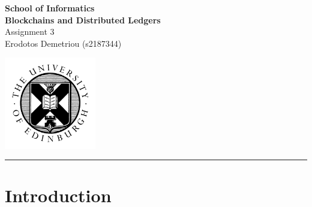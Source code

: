 \documentclass[11pt,a4paper]{article}
\begin{document}
\noindent
\begin{minipage}{120mm}
        {\huge {\bf School of Informatics}}\\
        {\Large {\bf Blockchains and Distributed Ledgers}}\\

        {\Large Assignment 3}\\
        {\normalsize Erodotos Demetriou (s2187344)}
\end{minipage}
\hfill
\begin{minipage}{40mm}              
        \includegraphics[width=40mm]{crest.png}
\end{minipage}

\begin{center}
\rule{\linewidth}{0.5mm}
\end{center}

\section*{Introduction}
\end{document}

